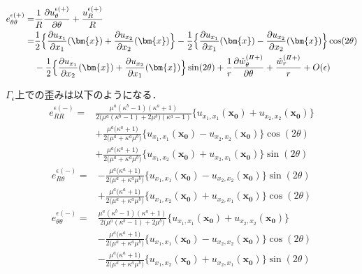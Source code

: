 \begin{align}
	e_{\theta\theta}^{\epsilon(+)}
		=&\frac{1}{R}\frac{\partial u_{\theta}^{\epsilon(+)}}{\partial \theta}
			+\frac{u_{R}^{\epsilon(+)}}{R}
		\nonumber
		\\
		=&\frac{1}{2}\Bigl\{ \frac{\partial u_{x_{1}}}{\partial x_{1}}(\bm{x})
			+\frac{\partial u_{x_{2}}}{\partial x_{2}}(\bm{x})\Bigr\}
		-\frac{1}{2}\Bigl\{ \frac{\partial u_{x_{1}}}{\partial x_{1}}(\bm{x})
			-\frac{\partial u_{x_{2}}}{\partial x_{2}}(\bm{x})\Bigr\}\cos(2\theta)
		\nonumber
		\\
		&-\frac{1}{2}\Bigl\{ \frac{\partial u_{x_{1}}}{\partial x_{2}}(\bm{x})
			+\frac{\partial u_{x_{2}}}{\partial x_{1}}(\bm{x})\Bigr\}\sin(2\theta)
		+\frac{1}{r}\frac{\partial \hat{w}_{\theta}^{(I\hspace{-.15em}I+)}}{\partial \theta}
			+\frac{\hat{w}_{r}^{(I\hspace{-.15em}I+)}}{r}+O(\epsilon)
	\label{eq:eThThOutEps}
\end{align}

$\Gamma_\epsilon$上での歪みは以下のようになる．
\begin{align}
	e_{RR}^{\epsilon(-)}
	=&\frac{\mu^{a}(\kappa^{b}-1)(\kappa^{a}+1)}{2\bigl(\mu^{a}(\kappa^{b}-1)+2\mu^{b}\bigr)(\kappa^{a}-1)}
	\bigl\{u_{x_{1},x_{1}}(\bm{x_{0}})+u_{x_{2},x_{2}}(\bm{x_{0}})\bigr\}
	\nonumber
	\\
	&+\frac{\mu^{a}\bigl(\kappa^{a}+1\bigr)}{2\bigl(\mu^{a}+\kappa^{a}\mu^{b}\bigr)}
	\bigl\{u_{x_{1},x_{1}}(\bm{x_{0}})-u_{x_{2},x_{2}}(\bm{x_{0}})\bigr\}\cos(2\theta)
	\nonumber
	\\
	&+\frac{\mu^{a}\bigl(\kappa^{a}+1\bigr)}{2\bigl(\mu^{a}+\kappa^{a}\mu^{b}\bigr)}
	\bigl\{u_{x_{1},x_{2}}(\bm{x_{0}})+u_{x_{2},x_{1}}(\bm{x_{0}})\bigr\}\sin(2\theta)
	\label{eq:eRRInEpsSol}
\end{align}
\begin{align}
	e_{R\theta}^{\epsilon(-)}
	=&-\frac{\mu^{a}\bigl(\kappa^{a}+1\bigr)}{2\bigl(\mu^{a}+\kappa^{a}\mu^{b}\bigr)}
	\bigl\{u_{x_{1},x_{1}}(\bm{x_{0}})-u_{x_{2},x_{2}}(\bm{x_{0}})\bigr\}\sin(2\theta)
	\nonumber
	\\
	&+\frac{\mu^{a}\bigl(\kappa^{a}+1\bigr)}{2\bigl(\mu^{a}+\kappa^{a}\mu^{b}\bigr)}
	\bigl\{u_{x_{1},x_{2}}(\bm{x_{0}})+u_{x_{2},x_{1}}(\bm{x_{0}})\bigr\}\cos(2\theta)
	\label{eq:eRThInEpsSol}
\end{align}
\begin{align}
	e_{\theta\theta}^{\epsilon(-)}
	=&\frac{\mu^{a}(\kappa^{b}-1)(\kappa^{a}+1)}{2\bigl(\mu^{a}(\kappa^{b}-1)+2\mu^{b}\bigr)}
	\bigl\{u_{x_{1},x_{1}}(\bm{x_{0}})+u_{x_{2},x_{2}}(\bm{x_{0}})\bigr\}
	\nonumber
	\\
	&-\frac{\mu^{a}\bigl(\kappa^{a}+1\bigr)}{2\bigl(\mu^{a}+\kappa^{a}\mu^{b}\bigr)}
	\bigl\{u_{x_{1},x_{1}}(\bm{x_{0}})-u_{x_{2},x_{2}}(\bm{x_{0}})\bigr\}\cos(2\theta)
	\nonumber
	\\
	&-\frac{\mu^{a}\bigl(\kappa^{a}+1\bigr)}{2\bigl(\mu^{a}+\kappa^{a}\mu^{b}\bigr)}
	\bigl\{u_{x_{1},x_{2}}(\bm{x_{0}})+u_{x_{2},x_{1}}(\bm{x_{0}})\bigr\}\sin(2\theta)
	\label{eq:eThThInEpsSol}
\end{align}

